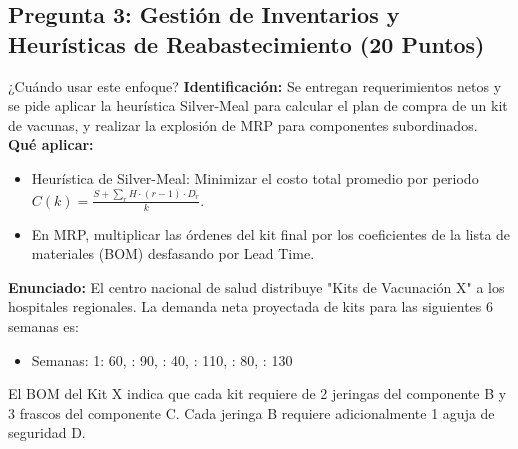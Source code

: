 \documentclass[11pt, a4paper]{article}
\begin{document}
\newpage

\subsection*{Pregunta 3: Gestión de Inventarios y Heurísticas de Reabastecimiento (20 Puntos)}

  \begin{tipprueba}{¿Cuándo usar este enfoque?}
    \textbf{Identificación:} Se entregan requerimientos netos y se pide aplicar la heurística Silver-Meal para calcular el plan de compra de un kit de vacunas, y realizar la explosión de MRP para componentes subordinados.\\
    \textbf{Qué aplicar:}
    \begin{itemize}
      \item Heurística de Silver-Meal: Minimizar el costo total promedio por periodo $C(k) = \frac{S + \sum_r H \cdot (r-1) \cdot D_r}{k}$.
      \item En MRP, multiplicar las órdenes del kit final por los coeficientes de la lista de materiales (BOM) desfasando por Lead Time.
    \end{itemize}
  \end{tipprueba}

  \textbf{Enunciado:}
  El centro nacional de salud distribuye "Kits de Vacunación X" a los hospitales regionales. La demanda neta proyectada de kits para las siguientes 6 semanas es:
  \begin{itemize}
    \item Semanas: 1: 60, : 90, : 40, : 110, : 80, : 130
  \end{itemize}

  El BOM del Kit X indica que cada kit requiere de 2 jeringas del componente B y 3 frascos del componente C. Cada jeringa B requiere adicionalmente 1 aguja de seguridad D.
  
  \begin{center}
  \end{center}
\end{document}
